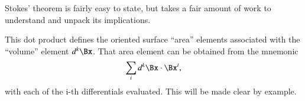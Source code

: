 %
%
Stokes' theorem is fairly easy to state, but takes a fair amount of work to understand and unpack its implications.



This dot product defines the oriented surface ``area'' elements associated with the ``volume'' element \( d^k \Bx \).
That area element can be obtained from the mnemonic
\begin{dmath}\label{eqn:statement:1561}
\sum_i d^k \Bx \cdot \Bx^i,
\end{dmath}
with each of the i-th differentials evaluated.
This will be made clear by example.

